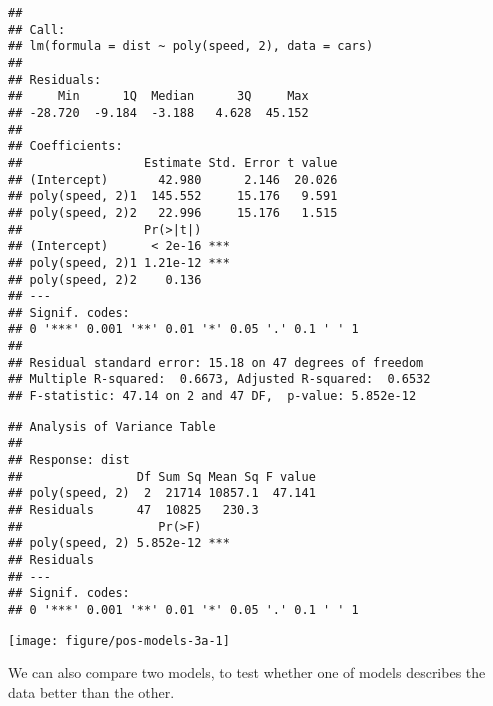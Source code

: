 \documentclass[paper=a4,headsepline,BCOR=12mm,twoside,open=right,%
titlepage,headings=small,fontsize=10pt,index=totoc,bibliography=totoc,%
captions=tableheading,captions=nooneline]{scrbook}\usepackage{knitr}
\begin{document}
\begin{knitrout}\footnotesize
{}\color{fgcolor}\begin{kframe}
\begin{alltt}
 \hlkwb{<-}  \hlopt{~}  \hlstd{),}  
  \hlstd{=} \hlstd{)} 
 
\end{alltt}
\begin{verbatim}
## 
## Call:
## lm(formula = dist ~ poly(speed, 2), data = cars)
## 
## Residuals:
##     Min      1Q  Median      3Q     Max 
## -28.720  -9.184  -3.188   4.628  45.152 
## 
## Coefficients:
##                 Estimate Std. Error t value
## (Intercept)       42.980      2.146  20.026
## poly(speed, 2)1  145.552     15.176   9.591
## poly(speed, 2)2   22.996     15.176   1.515
##                 Pr(>|t|)    
## (Intercept)      < 2e-16 ***
## poly(speed, 2)1 1.21e-12 ***
## poly(speed, 2)2    0.136    
## ---
## Signif. codes:  
## 0 '***' 0.001 '**' 0.01 '*' 0.05 '.' 0.1 ' ' 1
## 
## Residual standard error: 15.18 on 47 degrees of freedom
## Multiple R-squared:  0.6673,	Adjusted R-squared:  0.6532 
## F-statistic: 47.14 on 2 and 47 DF,  p-value: 5.852e-12
\end{verbatim}
\begin{alltt}
 
\end{alltt}
\begin{verbatim}
## Analysis of Variance Table
## 
## Response: dist
##                Df Sum Sq Mean Sq F value
## poly(speed, 2)  2  21714 10857.1  47.141
## Residuals      47  10825   230.3        
##                   Pr(>F)    
## poly(speed, 2) 5.852e-12 ***
## Residuals                   
## ---
## Signif. codes:  
## 0 '***' 0.001 '**' 0.01 '*' 0.05 '.' 0.1 ' ' 1
\end{verbatim}
\end{kframe}

{\centering \texttt{[image: figure/pos-models-3a-1]} 

}



\end{knitrout}

We can also compare two models, to test whether one of models describes the data better than the other.
\end{document}
